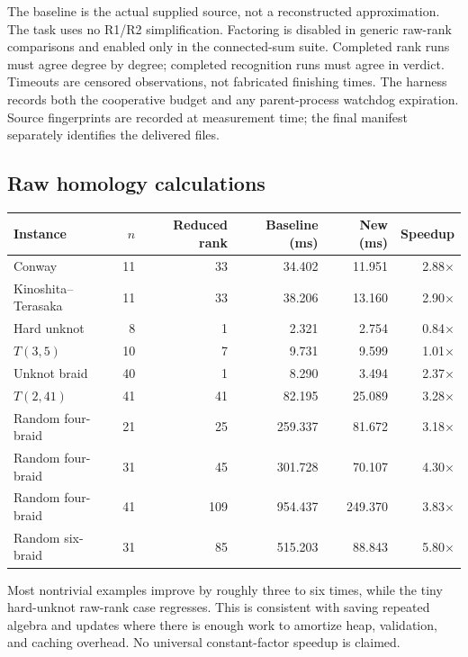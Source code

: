 \documentclass[11pt,letterpaper]{article}
\theoremstyle{definition}\newtheorem{definition}[theorem]{Definition}
\theoremstyle{remark}\newtheorem{remark}[theorem]{Remark}
\newcommand{\code}[1]{\texttt{\detokenize{#1}}}
\begin{document}
The baseline is the actual supplied source, not a reconstructed approximation.
The \code{rank} task uses no R1/R2 simplification. Factoring is disabled in generic
raw-rank comparisons and enabled only in the connected-sum suite. Completed rank
runs must agree degree by degree; completed recognition runs must agree in
verdict. Timeouts are censored observations, not fabricated finishing times.
The harness records both the cooperative budget and any parent-process watchdog
expiration. Source fingerprints are recorded at measurement time; the final
manifest separately identifies the delivered files.

\subsection{Raw homology calculations}

\begin{center}
\small
\setlength{\tabcolsep}{5pt}
\begin{tabular}{lrrrrr}
\toprule
Instance & $n$ & Reduced rank & Baseline (ms) & New (ms) & Speedup\\
\midrule
Conway & 11 & 33 & 34.402 & 11.951 & 2.88$\times$\\
Kinoshita--Terasaka & 11 & 33 & 38.206 & 13.160 & 2.90$\times$\\
Hard unknot & 8 & 1 & 2.321 & 2.754 & 0.84$\times$\\
$T(3,5)$ & 10 & 7 & 9.731 & 9.599 & 1.01$\times$\\
Unknot braid & 40 & 1 & 8.290 & 3.494 & 2.37$\times$\\
$T(2,41)$ & 41 & 41 & 82.195 & 25.089 & 3.28$\times$\\
Random four-braid & 21 & 25 & 259.337 & 81.672 & 3.18$\times$\\
Random four-braid & 31 & 45 & 301.728 & 70.107 & 4.30$\times$\\
Random four-braid & 41 & 109 & 954.437 & 249.370 & 3.83$\times$\\
Random six-braid & 31 & 85 & 515.203 & 88.843 & 5.80$\times$\\
\bottomrule
\end{tabular}
\end{center}

Most nontrivial examples improve by roughly three to six times, while the tiny
hard-unknot raw-rank case regresses. This is consistent with saving repeated
algebra and updates where there is enough work to amortize heap, validation,
and caching overhead. No universal constant-factor speedup is claimed.
\end{document}
